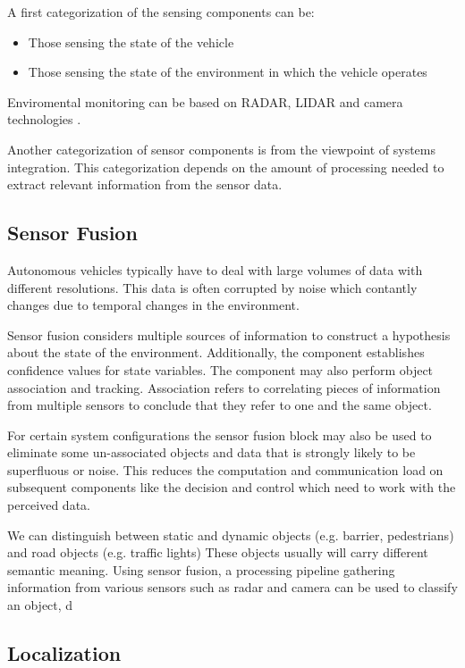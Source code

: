 A first categorization of the sensing components can be: \cite{Bahere, Serban}
\begin{itemize}
\item Those sensing the state of the vehicle 
\item Those sensing the state of the environment in which the vehicle operates
\end{itemize}

Enviromental monitoring can be based on RADAR, LIDAR and camera technologies \cite{Serban}. 

Another categorization of sensor components is from the viewpoint of systems integration. 
This categorization depends on the amount of processing needed to extract relevant information from the sensor data.

\subsection{Sensor Fusion}
Autonomous vehicles typically have to deal with large volumes of data with different resolutions. This data is often corrupted
by noise which contantly changes due to temporal changes in the environment. 

Sensor fusion considers multiple sources of information to construct a hypothesis about the state of the environment. 
Additionally, the component establishes confidence values for state variables.  The component may also perform object association and tracking. 
Association refers to correlating pieces of information from multiple sensors to conclude that they refer to one and the same object.

For certain system configurations the sensor fusion block may also be used to eliminate some un-associated objects and data that 
is strongly likely to be superfluous or noise. This reduces the computation and communication load on 
subsequent components like the decision and control which need to work with the perceived data.

We can distinguish between static and dynamic objects (e.g. barrier, pedestrians) and road objects (e.g. traffic lights)
These objects usually will carry different semantic meaning. Using sensor fusion, a processing pipeline gathering
information from various sensors such as radar and camera can be used to classify an object, d


\subsection{Localization}

